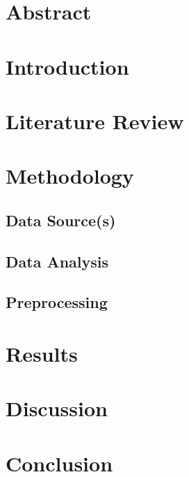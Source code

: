 \documentclass[12pt]{article}
\begin{document}
    \section{Abstract}
    \section{Introduction}
    \section{Literature Review}
    \section{Methodology}
        \subsection{Data Source(s)}
        \subsection{Data Analysis}
        \subsection{Preprocessing}
    \section{Results}
    \section{Discussion}
    \section{Conclusion}

    \newpage
    
    
\end{document}
